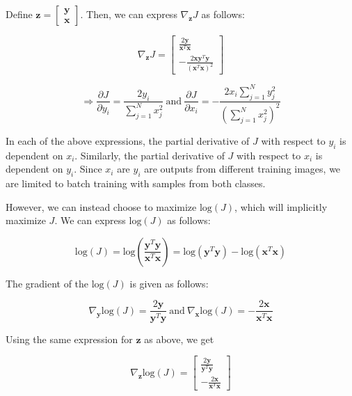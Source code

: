 \documentclass[fleqn]{article}
\begin{document}
\begin{enumerate}
		Define $\mathbf{z} = \begin{bmatrix} \mathbf{y} \\ \mathbf{x} \end{bmatrix}$. Then, we can express $\nabla_{\mathbf{z}}{J}$ as follows:
		
		\begin{equation*}
			\nabla_{\mathbf{z}}{J} = \begin{bmatrix}
				\frac{2\mathbf{y}}{\mathbf{x}^T\mathbf{x}} \\[3pt]
				-\frac{2\mathbf{x}\mathbf{y}^T\mathbf{y}}{(\mathbf{x}^T\mathbf{x})^2}
			\end{bmatrix}
		\end{equation*}
		
		\begin{equation*}
			\Rightarrow \frac{\partial{J}}{\partial{y_i}} = \frac{2y_i}{\sum_{j=1}^{N}x_j^2}\ \text{and}\ \frac{\partial{J}}{\partial{x_i}} = -\frac{2x_i\sum_{j=1}^{N}y_j^2}{\left(\sum_{j=1}^{N}x_j^2\right)^2}
		\end{equation*}
		
		In each of the above expressions, the partial derivative of $J$ with respect to $y_i$ is dependent on $x_i$. Similarly, the partial derivative of $J$ with respect to $x_i$ is dependent on $y_i$. Since $x_i$ are $y_i$ are outputs from different training images, we are limited to batch training with samples from both classes.
		
		However, we can instead choose to maximize $\text{log}(J)$, which will implicitly maximize $J$. We can express $\text{log}(J)$ as follows:
		
		\begin{equation*}
			\text{log}(J) = \text{log}\left(\frac{\mathbf{y}^T\mathbf{y}}{\mathbf{x}^T\mathbf{x}}\right) = \text{log}(\mathbf{y}^T\mathbf{y}) - \text{log}(\mathbf{x}^T\mathbf{x})
		\end{equation*}
		
		The gradient of the $\text{log}(J)$ is given as follows:
		
		\begin{equation*}
			\nabla_{\mathbf{y}}\text{log}({J}) = \frac{2\mathbf{y}}{\mathbf{y}^T\mathbf{y}} \ \text{and}\ \nabla_{\mathbf{x}}\text{log}({J}) = -\frac{2\mathbf{x}}{\mathbf{x}^T\mathbf{x}}
		\end{equation*}
		
		Using the same expression for $\mathbf{z}$ as above, we get
		
		\begin{equation*}
			\nabla_{\mathbf{z}}{\text{log}(J)} = \begin{bmatrix}
				\frac{2\mathbf{y}}{\mathbf{y}^T\mathbf{y}} \\[3pt]
				-\frac{2\mathbf{x}}{\mathbf{x}^T\mathbf{x}}
			\end{bmatrix}
		\end{equation*}
		

\end{enumerate}
\end{document}
